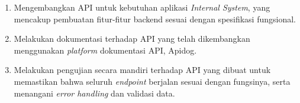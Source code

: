 \begin{enumerate}
    \item Mengembangkan API untuk kebutuhan aplikasi \textit{Internal System}, yang mencakup pembuatan fitur-fitur backend sesuai dengan spesifikasi fungsional.
    \item Melakukan dokumentasi terhadap API yang telah dikembangkan menggunakan \textit{platform} dokumentasi API, Apidog.
    \item Melakukan pengujian secara mandiri terhadap API yang dibuat untuk memastikan bahwa seluruh \textit{endpoint} berjalan sesuai dengan fungsinya, serta menangani \textit{error handling} dan validasi data.
\end{enumerate}







